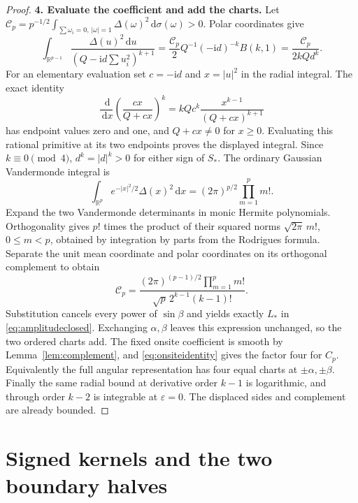 \documentclass[11pt]{article}
\numberwithin{equation}{section}
\theoremstyle{definition}
\newcommand{\dd}{\,\mathrm d}
\newcommand{\ii}{\mathrm i}
\newcommand{\R}{\mathbb R}
\newcommand{\eps}{\varepsilon}
\begin{document}
\begin{proof}
\par\smallskip\noindent\textbf{4. Evaluate the coefficient and add the charts.} Let $\mathscr C_p=p^{-1/2}\int_{\sum\omega_i=0,\,|\omega|=1}
\Delta(\omega)^2\dd\sigma(\omega)>0$. Polar coordinates give
\[
 \int_{\R^{p-1}}\frac{\Delta(u)^2\dd u}
 {(Q-\ii d\sum u_i^2)^{k+1}}
 =\frac{\mathscr C_p}{2}Q^{-1}(-\ii d)^{-k}B(k,1)
 =\frac{\mathscr C_p}{2kQd^k}.
\]
For an elementary evaluation set $c=-\ii d$ and $x=|u|^2$ in
the radial integral. The exact identity
\[
 \frac{\dd}{\dd x}\left(\frac{cx}{Q+cx}\right)^k
 =kQc^k\frac{x^{k-1}}{(Q+cx)^{k+1}}
\]
has endpoint values zero and one, and $Q+cx\ne0$ for $x\ge0$.
Evaluating this rational primitive at its two endpoints proves the
displayed integral. Since $k\equiv0\pmod4$,
$d^k=|d|^k>0$ for either sign of $S_*$. The ordinary Gaussian
Vandermonde integral is
\[
 \int_{\R^p}e^{-|x|^2/2}\Delta(x)^2\dd x
 =(2\pi)^{p/2}\prod_{m=1}^p m!.
\]
Expand the two Vandermonde determinants in monic
Hermite polynomials. Orthogonality gives $p!$ times the product of
their squared norms $\sqrt{2\pi}\,m!$, $0\le m<p$, obtained by
integration by parts from the Rodrigues formula. Separate the unit
mean coordinate and polar coordinates on its orthogonal complement
to obtain
\[
 \mathscr C_p=
 \frac{(2\pi)^{(p-1)/2}\prod_{m=1}^p m!}
 {\sqrt p\,2^{k-1}(k-1)!}.
\]
Substitution cancels every power of $\sin\beta$ and yields exactly
$L_*$ in \eqref{eq:amplitudeclosed}. Exchanging $\alpha,\beta$
leaves this expression unchanged, so the two ordered charts add.
The fixed onsite coefficient is smooth by Lemma~\ref{lem:complement},
and \eqref{eq:onsiteidentity} gives the factor four for $C_p$.
Equivalently the full angular representation has four equal charts
at $\pm\alpha,\pm\beta$. Finally the same radial bound at derivative
order $k-1$ is logarithmic, and through order $k-2$ is integrable
at $\eps=0$. The displaced sides and complement are already bounded.
\end{proof}

\section{Signed kernels and the two boundary halves}\label{sec:signs}
\end{document}
